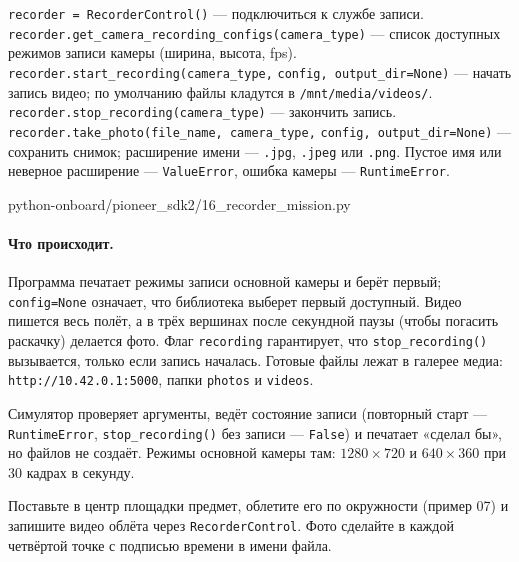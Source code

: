 \begin{codebox}
\verb|recorder = RecorderControl()| --- подключиться к службе записи.\\
\verb|recorder.get_camera_recording_configs(camera_type)| --- список доступных режимов записи камеры (ширина, высота, fps).\\
\verb|recorder.start_recording(camera_type,| \verb|config, output_dir=None)| --- начать запись видео; по умолчанию файлы кладутся в \texttt{/mnt/media/videos/}.\\
\verb|recorder.stop_recording(camera_type)| --- закончить запись.\\
\verb|recorder.take_photo(file_name, camera_type,| \verb|config, output_dir=None)| --- сохранить снимок; расширение имени --- \texttt{.jpg}, \texttt{.jpeg} или \texttt{.png}. Пустое имя или неверное расширение --- \verb|ValueError|, ошибка камеры --- \verb|RuntimeError|.
\end{codebox}

\begin{codefile}[python]{python-onboard/pioneer_sdk2/16_recorder_mission.py}
\end{codefile}

\paragraph{Что происходит.} Программа печатает режимы записи основной камеры и берёт первый; \verb|config=None| означает, что библиотека выберет первый доступный. Видео пишется весь полёт, а в трёх вершинах после секундной паузы (чтобы погасить раскачку) делается фото. Флаг \verb|recording| гарантирует, что \verb|stop_recording()| вызывается, только если запись началась. Готовые файлы лежат в галерее медиа: \texttt{http://10.42.0.1:5000}, папки \texttt{photos} и \texttt{videos}.

\begin{infobox}
Симулятор проверяет аргументы, ведёт состояние записи (повторный старт --- \verb|RuntimeError|, \verb|stop_recording()| без записи --- \verb|False|) и печатает «сделал бы», но файлов не создаёт. Режимы основной камеры там: $1280\times720$ и $640\times360$ при 30 кадрах в секунду.
\end{infobox}

\begin{taskbox}
Поставьте в центр площадки предмет, облетите его по окружности (пример 07) и запишите видео облёта через \verb|RecorderControl|. Фото сделайте в каждой четвёртой точке с подписью времени в имени файла.
\end{taskbox}
